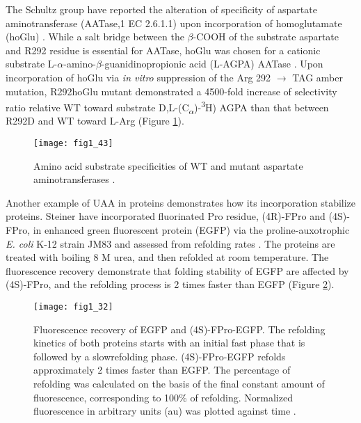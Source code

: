 \begin{refsection}
The Schultz group have reported the alteration of specificity of aspartate
aminotransferase (AATase,1 EC 2.6.1.1) upon incorporation of
homoglutamate (hoGlu) \cite{Park1997}. While a salt bridge between the
$\beta$-COOH of the substrate aspartate and R292 residue is essential for
AATase, hoGlu was chosen for a cationic substrate
L-$\alpha$-amino-$\beta$-guanidinopropionic acid (L-AGPA) AATase
\cite{Park1997}. Upon incorporation of hoGlu via \emph{in vitro} suppression of
the Arg 292 $\rightarrow$ TAG amber mutation, R292hoGlu mutant demonstrated a
4500-fold increase of selectivity ratio relative WT toward substrate
D,L-(C\textsubscript{$\alpha$})-\textsuperscript{3}H) AGPA than that between
R292D and WT toward L-Arg \cite{Park1997} (Figure \ref{fig:schultz}).
\begin{figure}[htbp] \centering \texttt{[image: fig1\_43]}
    \caption[Amino acid substrate specificities of WT and mutant aspartate
    aminotransferases.] {Amino acid substrate specificities of WT and mutant
        aspartate aminotransferases \cite{Park1997}.}
    \label{fig:schultz}
\end{figure}

Another example of UAA in proteins demonstrates how its incorporation stabilize
proteins. Steiner  have incorporated fluorinated Pro residue,
(4R)-FPro and (4S)-FPro, in enhanced green fluorescent protein (EGFP) via the
proline-auxotrophic \emph{E. coli} K-12 strain JM83 and assessed from
refolding rates \cite{Steiner2008}. The proteins are treated with boiling
8 M urea, and then refolded at room temperature. The fluorescence recovery
demonstrate that folding stability of EGFP are affected by (4S)-FPro, and the
refolding process is 2 times faster than EGFP (Figure \ref{fig:budisa}).
\begin{figure}[htbp] \centering \texttt{[image: fig1\_32]} 
    \caption[Fluorescence recovery of EGFP and (4S)-FPro-EGFP. The refolding
    kinetics of both proteins starts with an initial fast phase that is
followed by a slowrefolding phase. (4S)-FPro-EGFP refolds approximately 2 times
faster than EGFP. The percentage of refolding was calculated on the basis of
the final constant amount of fluorescence, corresponding to 100\% of refolding.
Normalized fluorescence in arbitrary units (au) was plotted against
time.]{Fluorescence recovery of EGFP and (4S)-FPro-EGFP. The refolding kinetics
    of both proteins starts with an initial fast phase that is followed by a
    slowrefolding phase. (4S)-FPro-EGFP refolds approximately 2 times faster
    than EGFP. The percentage of refolding was calculated on the basis of the
    final constant amount of fluorescence, corresponding to 100\% of refolding.
    Normalized fluorescence in arbitrary units (au) was plotted against time
    \cite{Steiner2008}.}
    \label{fig:budisa}
\end{figure}


\end{refsection}

